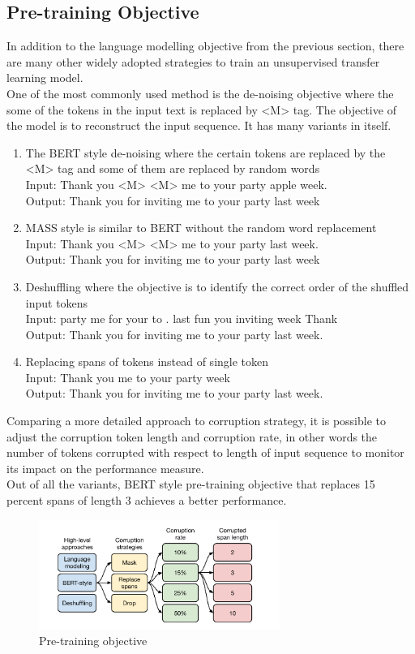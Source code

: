 \subsection{Pre-training Objective}
In addition to the language modelling objective from the previous section, there are many other widely adopted strategies to train an unsupervised transfer learning model. \\
One of the most commonly used method is the de-noising objective where the some of the tokens in the input text is replaced by <M> tag. The objective of the model is to reconstruct the input sequence. It has many variants in itself. 

\begin{enumerate}
   


  \item The BERT style de-noising where the certain tokens are replaced by the <M> tag and some of them are replaced by random words \\ Input: Thank you <M> <M> me to your party apple week. \\Output: Thank you for inviting me to your party last week 
  \item MASS style is similar to BERT without the random word replacement \\ Input: Thank you <M> <M> me to your party last week.  \\ Output: Thank you for inviting me to your party last week  
  \item Deshuffling where the objective is to identify the correct order of the shuffled input tokens  \\ Input: party me for your to . last fun you inviting week Thank  \\  Output: Thank you for inviting me to your party last week.  
  \item Replacing spans of tokens instead of single token \\ Input: Thank you me to your party week   \\  Output: Thank you for inviting me to your party last week.
\end{enumerate}
Comparing a more detailed approach to corruption strategy, it is possible to adjust the corruption token length and corruption rate, in other words the number of tokens corrupted with respect to length of input sequence to monitor its impact on the performance measure. \\
Out of all the variants, BERT style pre-training objective that replaces 15 percent spans of length 3 achieves a better performance. 
\begin{figure}[H]
\centering
\includegraphics[width=0.7\textwidth]{images/preobj.png}
\caption{Pre-training objective}
\label{fig:preobj}
\end{figure} 

